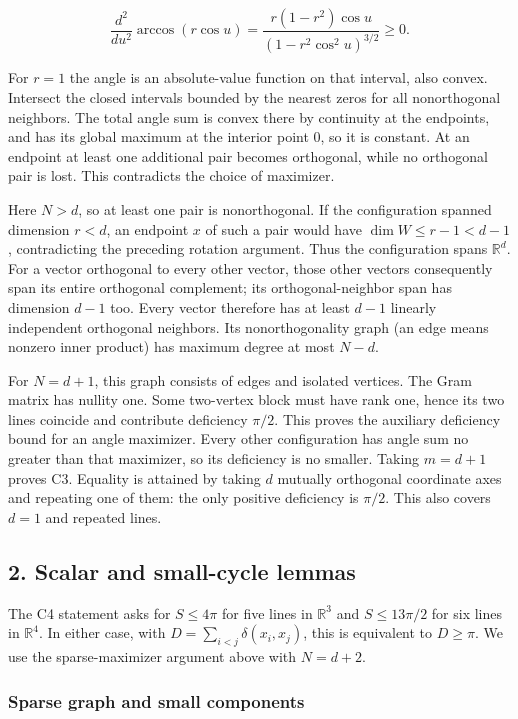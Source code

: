 \documentclass[11pt,a4paper]{article}
\begin{document}
\[
\frac{d^2}{du^2}\arccos(r\cos u)=\frac{r(1-r^2)\cos u}{(1-r^2\cos^2 u)^{3/2}}\ge0.
\]

For \(r=1\) the angle is an absolute-value function on that interval, also convex. Intersect the closed intervals bounded by the nearest zeros for all nonorthogonal neighbors. The total angle sum is convex there by continuity at the endpoints, and has its global maximum at the interior point \(0\), so it is constant. At an endpoint at least one additional pair becomes orthogonal, while no orthogonal pair is lost. This contradicts the choice of maximizer.

Here \(N>d\), so at least one pair is nonorthogonal. If the configuration spanned dimension \(r<d\), an endpoint \(x\) of such a pair would have \(\dim W\le r-1<d-1\), contradicting the preceding rotation argument. Thus the configuration spans \(\mathbb R^d\). For a vector orthogonal to every other vector, those other vectors consequently span its entire orthogonal complement; its orthogonal-neighbor span has dimension \(d-1\) too. Every vector therefore has at least \(d-1\) linearly independent orthogonal neighbors. Its nonorthogonality graph (an edge means nonzero inner product) has maximum degree at most \(N-d\).

For \(N=d+1\), this graph consists of edges and isolated vertices. The Gram matrix has nullity one. Some two-vertex block must have rank one, hence its two lines coincide and contribute deficiency \(\pi/2\). This proves the auxiliary deficiency bound for an angle maximizer. Every other configuration has angle sum no greater than that maximizer, so its deficiency is no smaller. Taking \(m=d+1\) proves C3. Equality is attained by taking \(d\) mutually orthogonal coordinate axes and repeating one of them: the only positive deficiency is \(\pi/2\). This also covers \(d=1\) and repeated lines.

\subsection{2. Scalar and small-cycle lemmas}\label{scalar-and-small-cycle-lemmas}

The C4 statement asks for \(S\le4\pi\) for five lines in \(\mathbb R^3\) and \(S\le13\pi/2\) for six lines in \(\mathbb R^4\). In either case, with \(D=\sum_{i<j}\delta(x_i,x_j)\), this is equivalent to \(D\ge\pi\). We use the sparse-maximizer argument above with \(N=d+2\).

\subsubsection{Sparse graph and small components}\label{sparse-graph-and-small-components}
\end{document}
